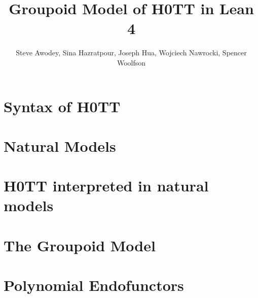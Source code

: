 
\title{Groupoid Model of H0TT in Lean 4}
\author{Steve Awodey, Sina Hazratpour, Joseph Hua,
  Wojciech Nawrocki, Spencer Woolfson}


\maketitle

\chapter{Syntax of H0TT}

\chapter{Natural Models}

\chapter{H0TT interpreted in natural models}

\chapter{The Groupoid Model}

\chapter{Polynomial Endofunctors}


{}



